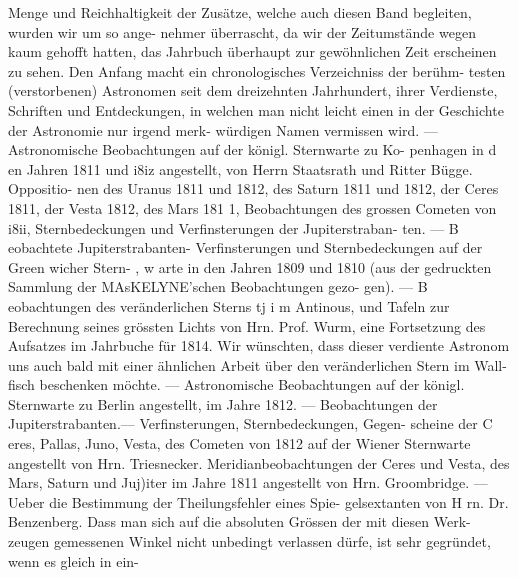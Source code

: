\documentclass[12pt,a4paper]{article}
\begin{document}
Menge und Reichhaltigkeit der Zusätze, welche auch diesen Band begleiten, wurden wir um so ange-\newline
nehmer überrascht, da wir der Zeitumstände wegen kaum gehofft hatten, das Jahrbuch überhaupt zur\newline
gewöhnlichen Zeit erscheinen zu sehen. Den Anfang macht ein chronologisches Verzeichniss der berühm-\newline
testen (verstorbenen) Astronomen seit dem dreizehnten Jahrhundert, ihrer Verdienste, Schriften und\newline
Entdeckungen, in welchen man nicht leicht einen in der Geschichte der Astronomie nur irgend merk-\newline
würdigen Namen vermissen wird. --- Astronomische Beobachtungen auf der königl. Sternwarte zu Ko-\newline
penhagen in d en Jahren 1811 und i8iz angestellt, von Herrn Staatsrath und Ritter Bügge. Oppositio-\newline
nen des Uranus 1811 und 1812, des Saturn 1811 und 1812, der Ceres 1811, der Vesta 1812, des Mars 181 1,\newline
Beobachtungen des grossen Cometen von i8ii, Sternbedeckungen und Verfinsterungen der Jupiterstraban-\newline
ten. --- B eobachtete Jupiterstrabanten- Verfinsterungen und Sternbedeckungen auf der Green wicher Stern-\newline
, w arte in den Jahren 1809 und 1810 (aus der gedruckten Sammlung der MAsKELYNE'schen Beobachtungen gezo-\newline
gen). --- B eobachtungen des veränderlichen Sterns tj i m Antinous, und Tafeln zur Berechnung seines grössten\newline
Lichts von Hrn. Prof. Wurm, eine Fortsetzung des Aufsatzes im Jahrbuche für 1814. Wir wünschten, dass\newline
dieser verdiente Astronom uns auch bald mit einer ähnlichen Arbeit über den veränderlichen Stern im Wall-\newline
fisch beschenken möchte. --- Astronomische Beobachtungen auf der königl. Sternwarte zu Berlin angestellt,\newline
im Jahre 1812. --- Beobachtungen der Jupiterstrabanten.--- Verfinsterungen, Sternbedeckungen, Gegen-\newline
scheine der C eres, Pallas, Juno, Vesta, des Cometen von 1812 auf der Wiener Sternwarte angestellt\newline
von Hrn. Triesnecker. Meridianbeobachtungen der Ceres und Vesta, des Mars, Saturn und Juj)iter im\newline
Jahre 1811 angestellt von Hrn. Groombridge. --- Ueber die Bestimmung der Theilungsfehler eines Spie-\newline
gelsextanten von H rn. Dr. Benzenberg. Dass man sich auf die absoluten Grössen der mit diesen Werk-\newline
zeugen gemessenen Winkel nicht unbedingt verlassen dürfe, ist sehr gegründet, wenn es gleich in ein-\newline
\end{document}
